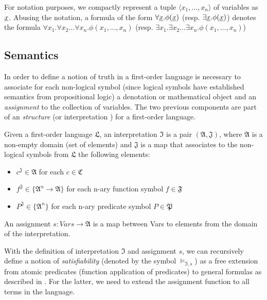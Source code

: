\begin{definition}
For notation purposes, we compactly represent a tuple $\langle x_1, \dots, x_n \rangle$ of variables as
$\underline{x}$. Abusing the notation, a formula of the form 
$\forall \underline{x} . \phi(\underline{x})$ (resp. $\exists \underline{x} . \phi(\underline{x})$)
denotes the formula $\forall x_1 . \forall x_2 \dots \forall x_n . \phi(x_1, \dots, x_n)$
(resp. $\exists x_1 . \exists x_2 \dots \exists x_n . \phi(x_1, \dots, x_n)$)

\end{definition}

\subsection{Semantics}

In order to define a notion of truth in a first-order language is necessary to associate for each non-logical symbol (since logical symbols have established semantics from propositional logic) a denotation or mathematical object and an \emph{assignment} to the collection of variables. The two previous components are part of an \emph{structure} \cite{DBLP:books/daglib/0076838} (or interpretation \cite{DBLP:books/daglib/0080654}) for a first-order language.

\begin{definition}
  Given a first-order language $\mathfrak{L}$, an interpretation $\mathfrak{I}$ is a pair $(\mathfrak{A}, \mathfrak{J})$, where $\mathfrak{A}$ is a non-empty domain (set of elements) and $\mathfrak{J}$ is a map that associates to the non-logical symbols from $\mathfrak{L}$ the following elements:
  \begin{itemize}
    \item $c^{\mathfrak{J}} \in \mathfrak{A}$ for each $c \in \mathfrak{C}$
    \item $f^{\mathfrak{J}} \in \{\mathfrak{A}^n \rightarrow \mathfrak{A}\}$ for each n-ary function symbol $f \in \mathfrak{F}$
    \item $P^{\mathfrak{J}} \in \{\mathfrak{A}^n\}$ for each n-ary predicate symbol $P \in \mathfrak{P}$
  \end{itemize}
  An assignment $s : Vars \rightarrow \mathfrak{A}$ is a map between Vars to elements from the domain of the interpretation.
\end{definition}

With the definition of interpretation $\mathfrak{I}$ and assignment $s$, we can recursively define a notion of \emph{satisfiability} (denoted by the symbol $\models_{\mathfrak{I}, s} $) as a free extension from atomic predicates (function application of predicates) to general formulas as described in \cite{DBLP:books/daglib/0076838}. For the latter, we need to extend the assignment function to all terms in the language.


